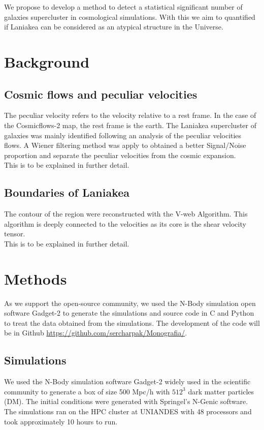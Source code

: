 \documentclass[12pt]{article}
\begin{document}
We propose to develop a method to detect a statistical significant number of galaxies
supercluster in cosmological simulations. 
With this we aim to quantified if Laniakea can be considered as an atypical structure in
the Universe. 
\\

\section{Background}
\subsection{Cosmic flows and peculiar velocities}
The peculiar velocity refers to the velocity relative to a rest frame. In the case of the
Cosmicflows-2 map, the rest frame is the earth. 
The Laniakea supercluster of galaxies was mainly identified following an analysis of the
peculiar velocities flows. A Wiener filtering method was apply to obtained a better
Signal/Noise proportion and separate the peculiar velocities from the cosmic expansion.\\
This is to be explained in further detail.



\subsection{Boundaries of Laniakea}
The contour of the region were reconstructed with the V-web Algorithm. This algorithm is deeply connected to the velocities as its core is the shear velocity tensor.\\

This is to be explained in further detail.

\section{Methods}

As we support the open-source community, we used the N-Body simulation open
software Gadget-2 \cite{springel_gadget_2_2005} to generate the simulations
and source code in C and Python to treat the data obtained from the
simulations. The development of the code will be in Github \url{https://github.com/sercharpak/Monografia/}.

\subsection{Simulations}
We used the N-Body simulation software Gadget-2 \cite{springel_gadget_2_2005}
widely used in the scientific community to generate a box of size 500 Mpc/h
with $512^{3}$ dark matter particles (DM). The initial conditions were
generated with Springel's N-Genic software. The simulations ran on the HPC cluster at UNIANDES with 48 processors and took approximately 10 hours to run. \\
\end{document}
